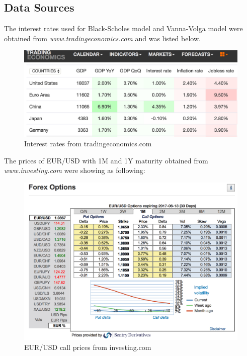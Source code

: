 \appendix
\chapter{}
\section{Data Sources}
The interest rates used for Black-Scholes model and Vanna-Volga model were obtained from \textit{www.tradingeconomics.com} and was listed below.
\begin{figure}[tbph]
	\centering
	\includegraphics[width=0.6\linewidth]{./Testing-data/online/interest_rate_tradingeconomics.png}
	\caption{Interest rates from tradingeconomics.com}
	\label{fig:interest-rate---trading-economics}
\end{figure}
\newline
The prices of EUR/USD with 1M and 1Y maturity obtained from \textit{www.investing.com} were showing as following:
\begin{figure}[tbph]
	\centering
	\includegraphics[scale=0.3]{./Testing-data/online/EURUSD_1M_investing.png} 
	\caption{EUR/USD call prices from investing.com}
	\label{fig:prices-investing.com} %
\end{figure}
